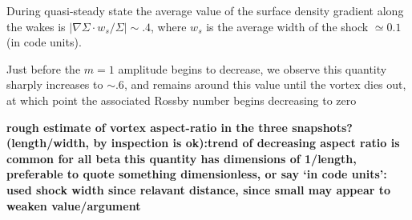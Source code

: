 During quasi-steady state the average value of the surface density gradient
along the wakes is $|\nabla\Sigma \cdot w_s/\Sigma| \sim .4 $, where $w_s$ is the 
average width of the shock $\simeq0.1$ (in code units).
  
Just before the $m=1$ amplitude begins to decrease, we observe this quantity
sharply increases to $ \sim .6 $, and remains around this value
until the vortex dies out, at which point the associated Rossby number
 begins decreasing to zero

{\bf rough estimate of
  vortex aspect-ratio in the three snapshots? 
  (length/width, by inspection is ok):trend of decreasing aspect ratio is common for all beta}  
{\bf this quantity has dimensions of 1/length, preferable to quote something
  dimensionless, or say `in code units': used shock width since relavant
 distance, since small may appear to weaken value/argument}

